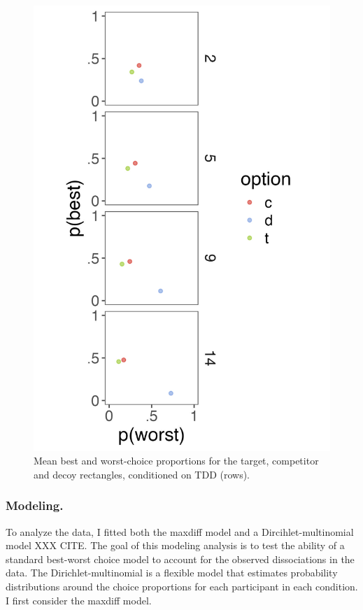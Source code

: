 {{{{ \begin{figure}
   \includegraphics[width=\linewidth]{figures/crit_mean_props_by_dist.jpeg}
   \caption{Mean best and worst-choice proportions for the target, competitor and decoy rectangles, conditioned on TDD (rows).}
   \label{fig:bw_mean_choice_collapsed}
 \end{figure}


\subsubsection{Modeling.}

To analyze the data, I fitted both the maxdiff model and a Dircihlet-multinomial model XXX CITE. The goal of this modeling analysis is to test the ability of a standard best-worst choice model to account for the observed dissociations in the data. The Dirichlet-multinomial is a flexible model that estimates probability distributions around the choice proportions for each participant in each condition. I first consider the maxdiff model.

}}}}
